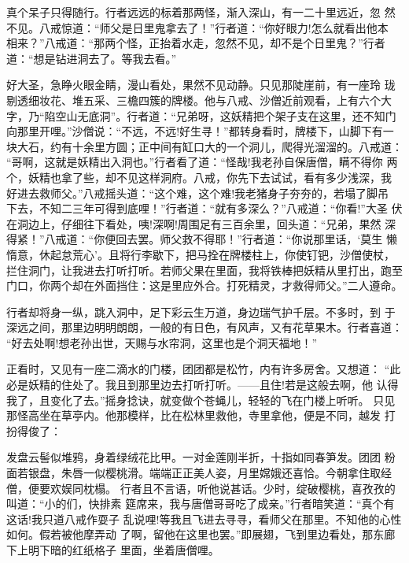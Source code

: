 真个呆子只得随行。行者远远的标着那两怪，渐入深山，有一二十里远近，忽
然不见。八戒惊道：“师父是日里鬼拿去了！”行者道：“你好眼力!怎么就看出他本
相来？”八戒道：“那两个怪，正抬着水走，忽然不见，却不是个日里鬼？”行者
道：“想是钻进洞去了。等我去看。”

好大圣，急睁火眼金睛，漫山看处，果然不见动静。只见那陡崖前，有一座玲
珑剔透细妆花、堆五采、三檐四簇的牌楼。他与八戒、沙僧近前观看，上有六个大
字，乃“陷空山无底洞”。行者道：“兄弟呀，这妖精把个架子支在这里，还不知门
向那里开哩。”沙僧说：“不远，不远!好生寻！”都转身看时，牌楼下，山脚下有一
块大石，约有十余里方圆；正中间有缸口大的一个洞儿，爬得光溜溜的。八戒道：
“哥啊，这就是妖精出入洞也。”行者看了道：“怪哉!我老孙自保唐僧，瞒不得你
两个，妖精也拿了些，却不见这样洞府。八戒，你先下去试试，看有多少浅深，我
好进去救师父。”八戒摇头道：“这个难，这个难!我老猪身子夯夯的，若塌了脚吊
下去，不知二三年可得到底哩！”行者道：“就有多深么？”八戒道：“你看!”大圣
伏在洞边上，仔细往下看处，咦!深啊!周围足有三百余里，回头道：“兄弟，果然
深得紧！”八戒道：“你便回去罢。师父救不得耶！”行者道：“你说那里话，‘莫生
懒惰意，休起怠荒心’。且将行李歇下，把马拴在牌楼柱上，你使钉钯，沙僧使杖，
拦住洞门，让我进去打听打听。若师父果在里面，我将铁棒把妖精从里打出，跑至
门口，你两个却在外面挡住：这是里应外合。打死精灵，才救得师父。”二人遵命。

行者却将身一纵，跳入洞中，足下彩云生万道，身边瑞气护千层。不多时，到
于深远之间，那里边明明朗朗，一般的有日色，有风声，又有花草果木。行者喜道：
“好去处啊!想老孙出世，天赐与水帘洞，这里也是个洞天福地！”

正看时，又见有一座二滴水的门楼，团团都是松竹，内有许多房舍。又想道：
“此必是妖精的住处了。我且到那里边去打听打听。——且住!若是这般去啊，他
认得我了，且变化了去。”摇身捻诀，就变做个苍蝇儿，轻轻的飞在门楼上听听。
只见那怪高坐在草亭内。他那模样，比在松林里救他，寺里拿他，便是不同，越发
打扮得俊了：

发盘云髻似堆鸦，身着绿绒花比甲。一对金莲刚半折，十指如同春笋发。团团
粉面若银盘，朱唇一似樱桃滑。端端正正美人姿，月里嫦娥还喜恰。今朝拿住取经
僧，便要欢娱同枕榻。
行者且不言语，听他说甚话。少时，绽破樱桃，喜孜孜的叫道：“小的们，快排素
筵席来，我与唐僧哥哥吃了成亲。”行者暗笑道：“真个有这话!我只道八戒作耍子
乱说哩!等我且飞进去寻寻，看师父在那里。不知他的心性如何。假若被他摩弄动
了啊，留他在这里也罢。”即展翅，飞到里边看处，那东廊下上明下暗的红纸格子
里面，坐着唐僧哩。

